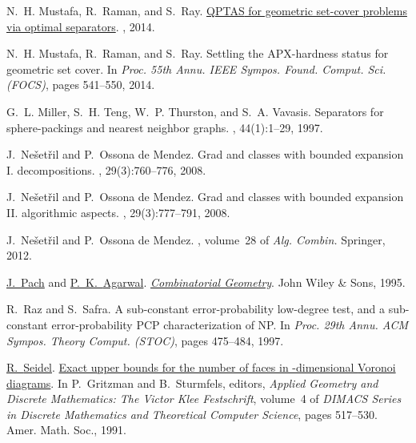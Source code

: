 \documentclass[12pt]{article}
\theoremstyle{remark}\theoremheaderfont{\sf}\theorembodyfont{\upshape}
\numberwithin{figure}{section}\numberwithin{table}{section}\numberwithin{equation}{section}
\begin{document}
{\begin{thebibliography}{vdSOdBV98}
N.~H. {Mustafa}, R.~{Raman}, and S.~{Ray}.
\newblock \href{http://arxiv.org/abs/1403.0835}{{QPTAS} for geometric set-cover
  problems via optimal separators}.
, 2014.

N.~H. Mustafa, R.~Raman, and S.~Ray.
\newblock  Settling the {APX}-hardness status for geometric set cover.
\newblock In {\em Proc. 55th Annu. IEEE Sympos. Found. Comput. Sci.
  {\em(FOCS)}}, pages 541--550, 2014.

G.~L. Miller, S.~H. Teng, W.~P. Thurston, and S.~A. Vavasis.
\newblock  Separators for sphere-packings and nearest neighbor graphs.
, 44(1):1--29, 1997.

J.~{Ne{\v s}et{\v r}il} and P.~{Ossona de Mendez}.
\newblock  Grad and classes with bounded expansion {I}. decompositions.
, 29(3):760--776, 2008.

J.~{Ne{\v s}et{\v r}il} and P.~{Ossona de Mendez}.
\newblock  Grad and classes with bounded expansion {II}. algorithmic aspects.
, 29(3):777--791, 2008.

J.~Ne{\v s}et{\v r}il and P.~{Ossona de Mendez}.
, volume~28 of
  {\em Alg. Combin.}
\newblock Springer, 2012.

\href{http://www.math.nyu.edu/~pach}{J.~{Pach}} and \href{http://www.cs.duke.edu/~pankaj}{P.~K.~{Agarwal}}.
\newblock \href{http://www.addall.com/Browse/Detail/0471588903.html}{{\em
  Combinatorial Geometry}}.
\newblock John Wiley \& Sons, 1995.

R.~Raz and S.~Safra.
\newblock  A sub-constant error-probability low-degree test, and a sub-constant
  error-probability {PCP} characterization of {NP}.
\newblock In {\em Proc. 29th Annu. ACM Sympos. Theory Comput. {\em(STOC)}},
  pages 475--484, 1997.

\href{http://www-tcs.cs.uni-sb.de/seidel/}{R.~{Seidel}}.
\newblock \href{http://dimacs.rutgers.edu/Volumes/Vol04.html}{Exact upper
  bounds for the number of faces in {}-dimensional {V}oronoi diagrams}.
\newblock In P.~Gritzman and B.~Sturmfels, editors, {\em Applied Geometry and
  Discrete Mathematics: The Victor Klee Festschrift}, volume~4 of {\em DIMACS
  Series in Discrete Mathematics and Theoretical Computer Science}, pages
  517--530. Amer. Math. Soc., 1991.


\end{thebibliography}}
\end{document}
